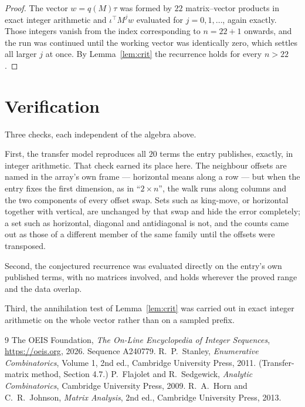 \documentclass[11pt,a4paper]{article}
\theoremstyle{plain}
\theoremstyle{definition}
\begin{document}
\begin{proof}
The vector $w=q(M)\tau$ was formed by $22$ matrix--vector products in exact integer
arithmetic and $\iota^{\!\top}M^{j}w$ evaluated for $j=0,1,\dots$, again exactly. Those
integers vanish from the index corresponding to $n=22+1$ onwards, and the run was
continued until the working vector was identically zero, which settles all larger $j$ at once.
By Lemma~\ref{lem:crit} the recurrence holds for every $n>22$.
\end{proof}

\section{Verification}

Three checks, each independent of the algebra above.

First, the transfer model reproduces all $20$ terms the entry publishes, exactly, in
integer arithmetic. That check earned its place here. The neighbour offsets are named in the
array's own frame --- horizontal means along a row --- but when the entry fixes the first
dimension, as in ``$2\times n$'', the walk runs along columns and the two components of every
offset swap. Sets such as king-move, or horizontal together with vertical, are unchanged by
that swap and hide the error completely; a set such as horizontal, diagonal and antidiagonal
is not, and the counts came out as those of a different member of the same family until the
offsets were transposed.

Second, the conjectured recurrence was evaluated directly on the entry's own published terms,
with no matrices involved, and holds wherever the proved range and the data overlap.

Third, the annihilation test of Lemma~\ref{lem:crit} was carried out in exact integer
arithmetic on the whole vector rather than on a sampled prefix.

\begin{thebibliography}{9}
 The OEIS Foundation, \emph{The On-Line Encyclopedia of Integer
Sequences}, \url{https://oeis.org}, 2026. Sequence A240779.
 R.~P.~Stanley, \emph{Enumerative Combinatorics}, Volume 1, 2nd ed.,
Cambridge University Press, 2011. (Transfer-matrix method, Section 4.7.)
 P.~Flajolet and R.~Sedgewick, \emph{Analytic Combinatorics}, Cambridge
University Press, 2009.
 R.~A.~Horn and C.~R.~Johnson, \emph{Matrix Analysis}, 2nd ed., Cambridge
University Press, 2013.
\end{thebibliography}
\end{document}
